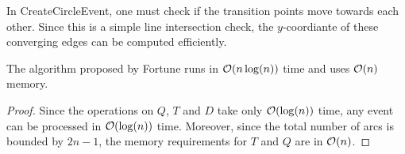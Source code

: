 \begin{breakablealgorithm}
\begin{algorithmic}[1]
                        \EndIf
                        \EndIf
                    \EndIf
                \EndProcedure
                        \EndIf
                    \EndFor
                        \EndIf
                    \EndFor
                \EndProcedure
            \end{algorithmic}
        \end{breakablealgorithm}

        \begin{remark} 
            In CreateCircleEvent, one must check if the transition points move towards each other. Since this is a simple line intersection check, the $y$-coordiante of these converging edges can be computed efficiently. 
        \end{remark}

        \begin{theorem}
            The algorithm proposed by Fortune runs in $\mathcal{O}(n\log(n))$ time and uses $\mathcal{O}(n)$ memory.
        \end{theorem}
        \begin{proof} 
            Since the operations on $Q$, $T$ and $D$ take only $\mathcal{O}(\log(n))$ time, any event can be processed in $\mathcal{O}(\log(n))$ time. Moreover, since the total number of arcs is bounded by $2n - 1$, the memory requirements for $T$ and $Q$ are in $\mathcal{O}(n)$. 
        \end{proof}

